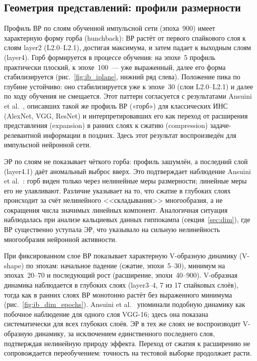 \subsection{Геометрия представлений: профили размерности}\label{sec:ib_geometry}

Профиль ВР по слоям обученной импульсной сети (эпоха~900) имеет характерную форму горба (hunchback): ВР растёт от первого спайкового слоя к слоям layer2 (L2.0--L2.1), достигая максимума, и затем падает к выходным слоям (layer4). Горб формируется в процессе обучения: на эпохе~5 профиль практически плоский, к эпохе~100~--- уже выраженный, далее его форма стабилизируется (рис.~\ref{fig:ib_iplane}, нижний ряд слева). Положение пика по глубине устойчиво: оно стабилизируется уже к эпохе~30 (слои L2.0--L2.1) и далее по ходу обучения не смещается. Этот паттерн согласуется с результатами Ansuini et al.~\cite{Ansuini2019}, описавших такой же профиль ВР («горб») для классических ИНС (AlexNet, VGG, ResNet) и интерпретировавших его как переход от расширения представления (expansion) в ранних слоях к сжатию (compression) задаче-релевантной информации в поздних. Здесь этот результат воспроизведён для импульсной нейронной сети.

ЭР по слоям не показывает чёткого горба: профиль зашумлён, а последний слой (layer4.1) даёт аномальный выброс вверх. Это подтверждает наблюдение Ansuini et al.~\cite{Ansuini2019}: горб виден только через нелинейные меры размерности; линейные меры его не улавливают. Различие указывает на то, что сжатие в глубоких слоях происходит за счёт нелинейного <<складывания>> многообразия, а не сокращения числа значимых линейных компонент. Аналогичная ситуация наблюдалась при анализе кальциевых данных гиппокампа (секция~\ref{sec:dim}), где ВР существенно уступала ЭР, что указывало на сильную нелинейность многообразия нейронной активности.

При фиксированном слое ВР показывает характерную V-образную динамику (V-shape) по эпохам: начальное падение (сжатие, эпохи~5--30), минимум на эпохах~20--70 и последующий рост (расширение, эпохи~40--900). V-образная динамика наблюдается в глубоких слоях (layer3--4, 7 из 17 спайковых слоёв), тогда как в ранних слоях ВР монотонно растёт без выраженного минимума (рис.~\ref{fig:ib_dim_epochs}). Ansuini et al.~\cite{Ansuini2019} упоминали подобную динамику как побочное наблюдение для одного слоя VGG-16; здесь она показана систематически для всех глубоких слоёв. ЭР в тех же слоях не воспроизводит V-образную динамику, за исключением единственного последнего слоя, подтверждая нелинейную природу эффекта. Переход от сжатия к расширению не сопровождается переобучением: точность на тестовой выборке продолжает расти.

